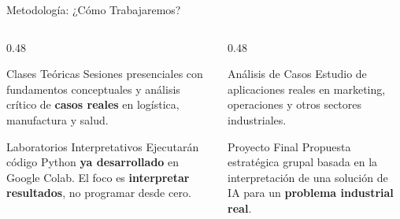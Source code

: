 \documentclass[aspectratio=169]{beamer}
\begin{document}
\begin{frame}{Metodología: ¿Cómo Trabajaremos?}
  \begin{columns}[T]
    \begin{column}{0.48\textwidth}
      \begin{conceptbox}{\faChalkboardTeacher\enspace Clases Teóricas}
        \small
        Sesiones presenciales con fundamentos conceptuales y
        análisis crítico de \textbf{casos reales} en logística,
        manufactura y salud.
      \end{conceptbox}
      \vspace{0.15cm}
      \begin{conceptbox}{\faFlask\enspace Laboratorios Interpretativos}
        \small
        Ejecutarán código Python \textbf{ya desarrollado} en
        Google Colab. El foco es \textbf{interpretar resultados},
        no programar desde cero.
      \end{conceptbox}
    \end{column}
    \begin{column}{0.48\textwidth}
      \begin{conceptbox}{\faSearch\enspace Análisis de Casos}
        \small
        Estudio de aplicaciones reales en marketing, operaciones
        y otros sectores industriales.
      \end{conceptbox}
      \vspace{0.15cm}
      \begin{conceptbox}{\faProjectDiagram\enspace Proyecto Final}
        \small
        Propuesta estratégica grupal basada en la interpretación
        de una solución de IA para un \textbf{problema industrial real}.
      \end{conceptbox}
    \end{column}
  \end{columns}
\end{frame}
\end{document}
